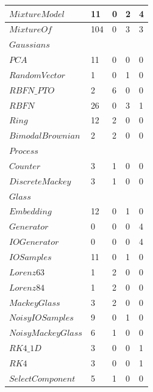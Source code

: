 \documentclass[twocolumn]{article}
\begin{document}
\begin{table}[h]
\begin{center}
{\begin{tabular}{|l|l|l|l|l|}
$MixtureModel               $ &     11 &       0 &       2 &       4 \\\hline
$MixtureOf                  $ &    104 &       0 &       3 &       3 \\
\hspace*{2mm} $Gaussians    $ &        &         &         &         \\\hline
$PCA                        $ &     11 &       0 &       0 &       0 \\\hline
$RandomVector               $ &      1 &       0 &       1 &       0 \\\hline
$RBFN\_PTO                  $ &      2 &       6 &       0 &       0 \\\hline
$RBFN                       $ &     26 &       0 &       3 &       1 \\\hline
$Ring                       $ &     12 &       2 &       0 &       0 \\\hline
$BimodalBrownian            $ &      2 &       2 &       0 &       0 \\
\hspace*{2mm} $Process      $ &        &         &         &         \\\hline
$Counter                    $ &      3 &       1 &       0 &       0 \\\hline
$DiscreteMackey             $ &      3 &       1 &       0 &       0 \\
\hspace*{2mm} $Glass        $ &        &         &         &         \\\hline
$Embedding                  $ &     12 &       0 &       1 &       0 \\\hline
$Generator                  $ &      0 &       0 &       0 &       4 \\\hline
$IOGenerator                $ &      0 &       0 &       0 &       4 \\\hline
$IOSamples                  $ &     11 &       0 &       1 &       0 \\\hline
$Lorenz63                   $ &      1 &       2 &       0 &       0 \\\hline
$Lorenz84                   $ &      1 &       2 &       0 &       0 \\\hline
$MackeyGlass                $ &      3 &       2 &       0 &       0 \\\hline
$NoisyIOSamples             $ &      9 &       0 &       1 &       0 \\\hline
$NoisyMackeyGlass           $ &      6 &       1 &       0 &       0 \\\hline
$RK4\_1D                    $ &      3 &       0 &       0 &       1 \\\hline
$RK4                        $ &      3 &       0 &       0 &       1 \\\hline
$SelectComponent            $ &      5 &       1 &       0 &       0 \\\hline
\end{tabular}
}
\end{center}
\end{table}
\end{document}
